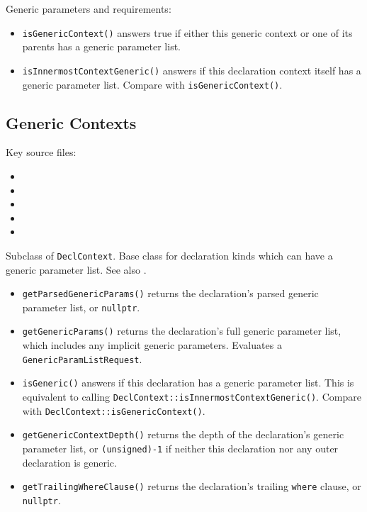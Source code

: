 \documentclass[../generics]{subfiles}
\begin{document}
Generic parameters and requirements:
\begin{itemize}
\item \texttt{isGenericContext()} answers true if either this generic context or one of its parents has a generic parameter list.
\item \texttt{isInnermostContextGeneric()} answers if this declaration context itself has a generic parameter list. Compare with \texttt{isGenericContext()}.
\end{itemize}

\subsection*{Generic Contexts}

Key source files:
\begin{itemize}
\item {}
\item {}
\item {}
\item {}
\item {}
\end{itemize}

Subclass of \texttt{DeclContext}. Base class for declaration kinds which can have a generic parameter list. See also .
\begin{itemize}
\item \texttt{getParsedGenericParams()} returns the declaration's parsed generic parameter list, or \texttt{nullptr}.
\item \texttt{getGenericParams()} returns the declaration's full generic parameter list, which includes any implicit generic parameters. Evaluates a \texttt{GenericParamListRequest}.
\item \texttt{isGeneric()} answers if this declaration has a generic parameter list. This is equivalent to calling \texttt{DeclContext::isInnermostContextGeneric()}. Compare with \texttt{DeclContext::isGenericContext()}.
\item \texttt{getGenericContextDepth()} returns the depth of the declaration's generic parameter list, or \texttt{(unsigned)-1} if neither this declaration nor any outer declaration is generic.
\item \texttt{getTrailingWhereClause()} returns the declaration's trailing \texttt{where} clause, or \texttt{nullptr}.
\end{itemize}
\end{document}
